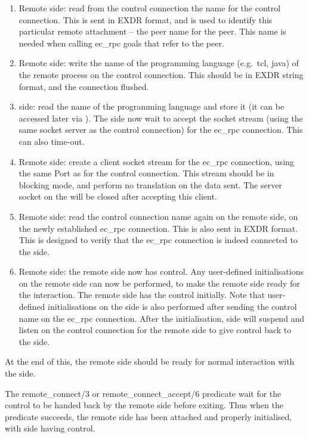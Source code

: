 \begin{enumerate}
\item Remote side: read from the control connection the {\eclipse} name for the control
connection. This is sent in EXDR format, and is used to identify this
particular remote attachment -- the peer name for the peer. This name is needed when calling ec_rpc goals
that refer to the peer. 
\item Remote side: write the name of the programming language (e.g.\ tcl, java) of the
remote process on the control connection. This should be in EXDR string
format, and the connection flushed. 
\item {\eclipse} side: read the name of the programming language and store
it (it can be accessed later via ). The {\eclipse}
side now wait to accept the socket stream (using the same socket server as
the control connection) for the ec_rpc connection. This can also time-out.
\item Remote side: create a client socket stream for the ec_rpc connection, using the
same Port as for the control connection. This stream should be in
blocking mode, and perform no translation on the data sent. The server
socket on the {\eclipse} will be closed after accepting this client.
\item Remote side: read the control connection name again on the remote side, on the
newly established ec_rpc connection. This is also sent in EXDR format. This
is designed to verify that the ec_rpc connection is indeed connected to the
{\eclipse} side. 
\item Remote side: the remote side now has control. Any user-defined initialisations on the remote
side can now be performed, to make the remote side ready for the
interaction. The remote side has the control initially. Note that
user-defined initialisations on the {\eclipse} side is also performed after
sending the control name on the ec_rpc connection. After the
initialisation, {\eclipse} side will suspend and listen on the control
connection for the remote side to give control back to the {\eclipse} side.
\end{enumerate}

At the end of this, the remote side should be ready for normal interaction
with the {\eclipse} side.

The remote_connect/3 or remote_connect_accept/6 predicate wait for the control to be handed back by
the remote side before exiting. Thus when the predicate succeeds, the
remote side has been attached and properly initialised, with {\eclipse}
side having control.


